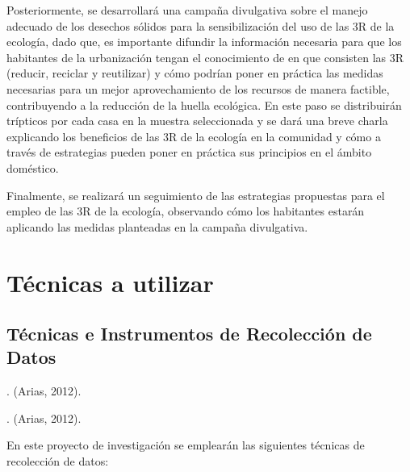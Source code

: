 Posteriormente, se desarrollará una campaña divulgativa sobre el manejo adecuado de los desechos sólidos para la sensibilización del uso de las 3R de la ecología, dado que, es importante difundir la información necesaria para que los habitantes de la urbanización tengan el conocimiento de en que consisten las 3R (reducir, reciclar y reutilizar) y cómo podrían poner en práctica las medidas necesarias para un mejor aprovechamiento de los recursos de manera factible, contribuyendo a la reducción de la huella ecológica. En este paso se distribuirán trípticos por cada casa en la muestra seleccionada y se dará una breve charla explicando los beneficios de las 3R de la ecología en la comunidad y cómo a través de estrategias pueden poner en práctica sus principios en el ámbito doméstico.

Finalmente, se realizará un seguimiento de las estrategias propuestas para el  empleo de las 3R de la ecología, observando cómo los habitantes estarán aplicando las medidas planteadas en la campaña divulgativa.

\section{Técnicas a utilizar}

\subsection{Técnicas e Instrumentos de Recolección de Datos}

. (Arias, 2012).

. (Arias, 2012).

En este proyecto de investigación se emplearán las siguientes técnicas de recolección de datos:


